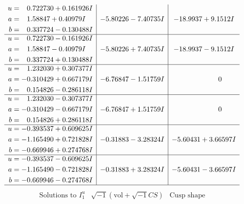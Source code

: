 \documentclass[1p]{elsarticle_modified}
\theoremstyle{definition}
\newcommand{\I}{\sqrt{-1}}
\begin{document}
$$\begin{array}{c|c|c}
\begin{aligned}
u &= \phantom{-}0.722730 + 0.161926 I \\
a &= \phantom{-}1.58847 + 0.40979 I \\
b &= \phantom{-}0.337724 - 0.130488 I\end{aligned}
 & -5.80226 - 7.40735 I & -18.9937 + 9.1512 I \\ \hline\begin{aligned}
u &= \phantom{-}0.722730 - 0.161926 I \\
a &= \phantom{-}1.58847 - 0.40979 I \\
b &= \phantom{-}0.337724 + 0.130488 I\end{aligned}
 & -5.80226 + 7.40735 I & -18.9937 - 9.1512 I \\ \hline\begin{aligned}
u &= \phantom{-}1.232030 + 0.307377 I \\
a &= -0.310429 + 0.667179 I \\
b &= \phantom{-}0.154826 - 0.286118 I\end{aligned}
 & -6.76847 - 1.51759 I & \phantom{-0.000000 } 0 \\ \hline\begin{aligned}
u &= \phantom{-}1.232030 - 0.307377 I \\
a &= -0.310429 - 0.667179 I \\
b &= \phantom{-}0.154826 + 0.286118 I\end{aligned}
 & -6.76847 + 1.51759 I & \phantom{-0.000000 } 0 \\ \hline\begin{aligned}
u &= -0.393537 + 0.609625 I \\
a &= -1.165490 + 0.721828 I \\
b &= -0.669946 + 0.274768 I\end{aligned}
 & -0.31883 - 3.28324 I & -5.60431 + 3.66597 I \\ \hline\begin{aligned}
u &= -0.393537 - 0.609625 I \\
a &= -1.165490 - 0.721828 I \\
b &= -0.669946 - 0.274768 I\end{aligned}
 & -0.31883 + 3.28324 I & -5.60431 - 3.66597 I\\
 \hline 
 \end{array}$$\newpage$$\begin{array}{c|c|c}  
\text{Solutions to }I^u_{1}& \I (\text{vol} + \sqrt{-1}CS) & \text{Cusp shape}\\
 \hline 
\begin{aligned}

\end{aligned}
\end{array}$$
\end{document}
